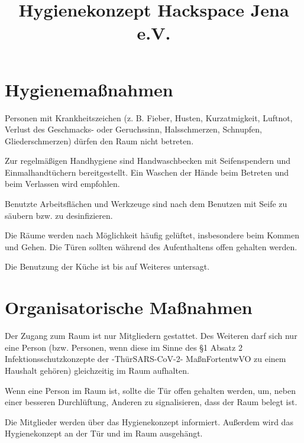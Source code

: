 \documentclass[a4paper,12pt,parskip=half]{scrartcl}
\title{Hygienekonzept Hackspace Jena e.V.}
\begin{document}
\maketitle

\section*{Hygienemaßnahmen}

Personen mit Krankheitszeichen (z. B. Fieber, Husten, Kurzatmigkeit, Luftnot, Verlust des
Geschmacks- oder Geruchssinn, Halsschmerzen, Schnupfen, Gliederschmerzen) dürfen den Raum nicht betreten.

Zur regelmäßigen Handhygiene sind Handwaschbecken mit Seifenspendern und
Einmalhandtüchern bereitgestellt. Ein Waschen der Hände beim Betreten und beim Verlassen wird empfohlen.

Benutzte Arbeitsflächen und Werkzeuge sind nach dem Benutzen mit Seife zu säubern bzw. zu desinfizieren.

Die Räume werden nach Möglichkeit häufig gelüftet, insbesondere beim Kommen und Gehen. Die Türen sollten während des Aufenthaltens offen gehalten werden.

Die Benutzung der Küche ist bis auf Weiteres untersagt.

\section*{Organisatorische Maßnahmen}

Der Zugang zum Raum ist nur Mitgliedern gestattet. Des Weiteren darf sich nur eine Person (bzw. Personen, wenn diese im Sinne des §1 Absatz 2 Infektionsschutzkonzepte der -ThürSARS-CoV-2-
MaßnFortentwVO zu einem Haushalt gehören) gleichzeitig im Raum aufhalten.

Wenn eine Person im Raum ist, sollte die Tür offen gehalten werden, um, neben einer besseren Durchlüftung, Anderen zu signalisieren, dass der Raum belegt ist. 

Die Mitglieder werden über das Hygienekonzept informiert. Außerdem wird das Hygienekonzept an der Tür und im Raum ausgehängt.
\end{document}

